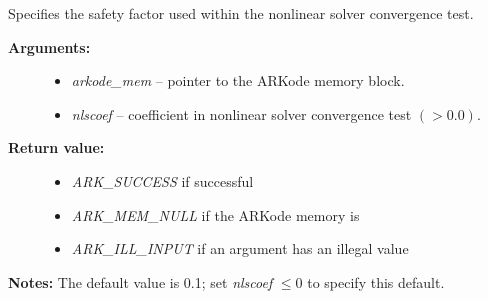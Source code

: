 \documentclass[letterpaper,10pt,english]{sphinxmanual}
\begin{document}
\begin{fulllineitems}
\label{c_interface/User_callable:ARKodeSetNonlinConvCoef}
Specifies the safety factor used within the nonlinear
solver convergence test.
\begin{description}
\item[{\textbf{Arguments:}}] \leavevmode\begin{itemize}
\item {} 
\emph{arkode\_mem} -- pointer to the ARKode memory block.

\item {} 
\emph{nlscoef} -- coefficient in nonlinear solver convergence test $(>0.0)$.

\end{itemize}

\item[{\textbf{Return value:}}] \leavevmode\begin{itemize}
\item {} 
\emph{ARK\_SUCCESS} if successful

\item {} 
\emph{ARK\_MEM\_NULL} if the ARKode memory is 

\item {} 
\emph{ARK\_ILL\_INPUT} if an argument has an illegal value

\end{itemize}

\end{description}

\textbf{Notes:} The default value is 0.1; set \emph{nlscoef} $\le 0$
to specify this default.

\end{fulllineitems}

\end{document}
